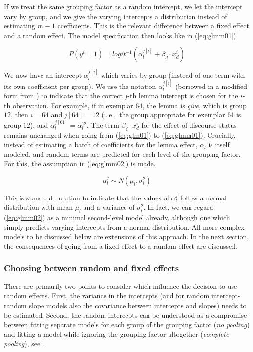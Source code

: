 \documentclass[a4paper,12pt]{article}
\newcommand{\ie}{i.\,e.,\ }
\begin{document}
If we treat the same grouping factor as a random intercept, we let the intercept vary by group, and we give the varying intercepts a distribution instead of estimating $m-1$ coefficients.
This is the relevant difference between a fixed effect and a random effect.
The model specification then looks like in (\ref{eq:glmm01}).

\begin{equation}
  P(y^i=1)=logit^{-1}(\alpha_{l}^{j[i]}+\beta_d\cdot x_d^i)
  \label{eq:glmm01}
\end{equation}

We now have an intercept $\alpha_l^{j[i]}$ which varies by group (instead of one term with its own coefficient per group).
We use the notation $\alpha_l^{j[i]}$ (borrowed in a modified form from \citealt{GelmanHill2006}) to indicate that the correct $j$-th lemma intercept is chosen for the $i$-th observation.
For example, if in exemplar $64$, the lemma is \textit{give}, which is group $12$, then $i=64$ and $j[64]=12$ (\ie the group appropriate for exemplar $64$ is group $12$), and $\alpha_l^{j[64]}=\alpha_l^{12}$.
The term $\beta_d\cdot x_d^i$ for the effect of discourse status remains unchanged when going from (\ref{eq:glm01}) to (\ref{eq:glmm01}).
Crucially, instead of estimating a batch of coefficients for the lemma effect, $\alpha_l$ is itself modeled, and random terms are predicted for each level of the grouping factor.
For this, the assumption in (\ref{eq:glmm02}) is made.

\begin{equation}
  \alpha_l^j\sim N(\mu_l,\sigma_l^2)
  \label{eq:glmm02}
\end{equation}

This is standard notation to indicate that the values of $\alpha_l^j$ follow a normal distribution with mean $\mu_l$ and a variance of $\sigma_l^2$.
In fact, we can regard (\ref{eq:glmm02}) as a minimal second-level model already, although one which simply predicts varying intercepts from a normal distribution.
All more complex models to be discussed below are extensions of this approach.
In the next section, the consequences of going from a fixed effect to a random effect are discussed.

\subsubsection{Choosing between random and fixed effects}
\label{sec:choosingbetweenrandomandfixedeffects}

There are primarily two points to consider which influence the decision to use random effects.
First, the variance in the intercepts (and for random intercept-random slope models also the covariance between intercepts and slopes) needs to be estimated.
Second, the random intercepts can be understood as a compromise between fitting separate models for each group of the grouping factor (\textit{no pooling}) and fitting a model while ignoring the grouping factor altogether (\textit{complete pooling}), see \citet[Ch.~12]{GelmanHill2006}.
\end{document}
